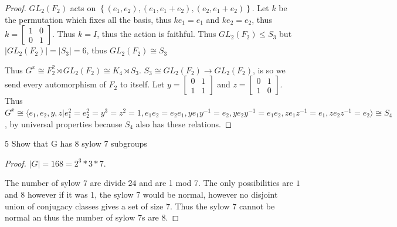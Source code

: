 \documentclass{article}
\newcommand{\angles}[1]{\langle #1 \rangle}
\begin{document}
\begin{proof}
    $GL_2(F_2)$ acts on $\left\{ (e_1, e_2), (e_1, e_1 + e_2), (e_2, e_1 + e_2) \right\}$. Let $k$ be the permutation which fixes all the basis, thus $ke_1 = e_1$ and $ke_2 = e_2$, thus $k = \begin{bmatrix}
        1 & 0 \\ 0 & 1
    \end{bmatrix}$. Thus $k = I$, thus the action is faithful. Thus $GL_2(F_2) \leq S_3$ but $|GL_2(F_2)| = |S_3| = 6$, thus $GL_2(F_2) \cong S_3$    
    
    Thus $G^x \cong F_2^2 \rtimes GL_2(F_2)\cong K_4 \rtimes S_3$. $S_3 \cong GL_2(F_2) \to GL_2(F_2)$, is so we send every automorphism of $F_2$ to itself. Let $y = \begin{bmatrix}
        0 & 1 \\ 1 & 1
    \end{bmatrix}$ and $z = \begin{bmatrix}
        0 & 1 \\ 1 & 0
    \end{bmatrix}$. Thus $G^x \cong \angles{e_1, e_2, y, z| e_1^2 = e_2^2 = y^3 = z^2 = 1,  e_1e_2 = e_2e_1, ye_1y^{-1} = e_2, ye_2y^{-1} = e_1e_2, ze_{1}z^{-1}  =e_1, ze_2z^{-1} = e_2} \cong S_4$, by universal properties because $S_4$ also has these relations.  
\end{proof}

\bigskip

\begin{PROB}{5}\label{Problem 5.}
    Show that G has 8 sylow 7 subgroups
\end{PROB}
\begin{proof}
    $|G| = 168 = 2^3 * 3 * 7$.
    
    The number of sylow $7$ are divide $24$ and are 1 mod 7. The only possibilities are $1$ and $8$ however if it was 1, the sylow 7 would be normal, however no disjoint union of conjugacy classes gives a set of size 7. Thus the sylow 7 cannot be normal an thus the number of sylow 7s are 8.      
\end{proof}
\end{document}
